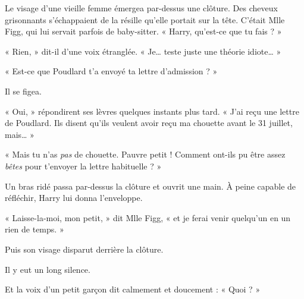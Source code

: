 Le visage d'une vieille femme émergea par-dessus une clôture. Des cheveux grisonnants s'échappaient de la résille qu'elle portait sur la tête. C'était Mlle Figg, qui lui servait parfois de baby-sitter. « Harry, qu'est-ce que tu fais ? »

« Rien, » dit-il d'une voix étranglée. « Je… teste juste une théorie idiote… »

« Est-ce que Poudlard t'a envoyé ta lettre d'admission ? »

Il se figea.

« Oui, » répondirent ses lèvres quelques instants plus tard. « J'ai reçu une lettre de Poudlard. Ils disent qu'ils veulent avoir reçu ma chouette avant le 31 juillet, mais… »

« Mais tu n'as \emph{pas}  de chouette. Pauvre petit ! Comment ont-ils pu être assez \emph{bêtes}  pour t'envoyer la lettre habituelle ? »

Un bras ridé passa par-dessus la clôture et ouvrit une main. À peine capable de réfléchir, Harry lui donna l'enveloppe.

« Laisse-la-moi, mon petit, » dit Mlle Figg, « et je ferai venir quelqu'un en un rien de temps. »

Puis son visage disparut derrière la clôture.

Il y eut un long silence.

Et la voix d'un petit garçon dit calmement et doucement : « Quoi ? »

